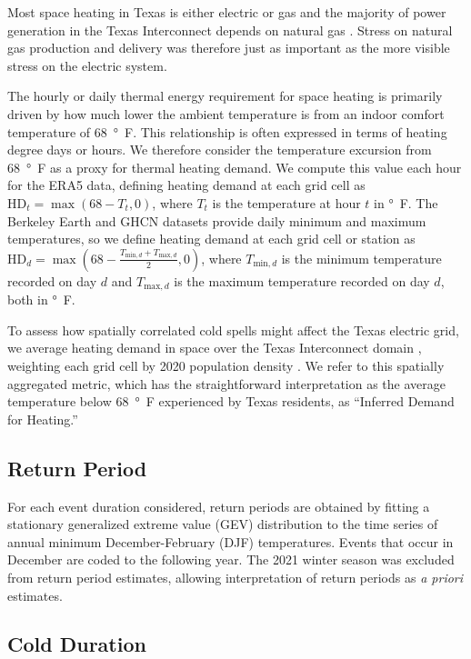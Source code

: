 \documentclass[12pt]{iopart}
\begin{document}
Most space heating in Texas is either electric or gas \cite{waite_heating:2020} and the majority of power generation in the Texas Interconnect depends on natural gas \cite{everhart_iea:2021}.
Stress on natural gas production and delivery was therefore just as important as the more visible stress on the electric system.

The hourly or daily thermal energy requirement for space heating is primarily driven by how much lower the ambient temperature is from an indoor comfort temperature of \SI{68}{\degree F}.
This relationship is often expressed in terms of heating degree days or hours.
We therefore consider the temperature excursion from \SI{68}{\degree F} as a proxy for thermal heating demand.
We compute this value each hour for the ERA5 data, defining heating demand at each grid cell as $\text{HD}_t = \max (68 - T_t, 0)$, where $T_t$ is the temperature at hour $t$ in \si{\degree F}.
The Berkeley Earth and GHCN datasets provide daily minimum and maximum temperatures, so we define heating demand at each grid cell or station as $\text{HD}_d = \max (68 -\frac{T_{\text{min},d} + T_{\text{max},d}}{2}, 0)$, where $T_{\text{min},d}$ is the minimum temperature recorded on day $d$ and $T_{\text{max},d}$ is the maximum temperature recorded on day $d$, both in \si{\degree F}.

To assess how spatially correlated cold spells might affect the Texas electric grid, we average heating demand in space over the Texas Interconnect domain \cite{useia_regions:2021}, weighting each grid cell by 2020 population density \cite{ciesin_gpwv4:2016}.
We refer to this spatially aggregated metric, which has the straightforward interpretation as the average temperature below \SI{68}{\degree F} experienced by Texas residents, as ``Inferred Demand for Heating.''

\subsection{Return Period}

For each event duration considered, return periods are obtained by fitting a stationary generalized extreme value (GEV) distribution to the time series of annual minimum December-February (DJF) temperatures.
Events that occur in December are coded to the following year.
The 2021 winter season was excluded from return period estimates, allowing interpretation of return periods as \emph{a priori} estimates.

\subsection{Cold Duration}
\end{document}

